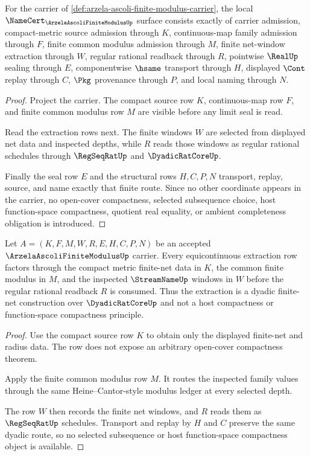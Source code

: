 \begin{theorem}
\label{thm:arzela-ascoli-finite-modulus-namecert-obligations}
For the carrier of \autoref{def:arzela-ascoli-finite-modulus-carrier}, the local $\NameCert_{\ArzelaAscoliFiniteModulusUp}$ surface consists exactly of carrier admission, compact-metric source admission through $K$, continuous-map family admission through $F$, finite common modulus admission through $M$, finite net-window extraction through $W$, regular rational readback through $R$, pointwise $\RealUp$ sealing through $E$, componentwise $\hsame$ transport through $H$, displayed $\Cont$ replay through $C$, $\Pkg$ provenance through $P$, and local naming through $N$.
\end{theorem}
\begin{proof}
Project the carrier. The compact source row $K$, continuous-map row $F$, and finite common modulus row $M$ are visible before any limit seal is read.

Read the extraction rows next. The finite windows $W$ are selected from displayed net data and inspected depths, while $R$ reads those windows as regular rational schedules through $\RegSeqRatUp$ and $\DyadicRatCoreUp$.

Finally the seal row $E$ and the structural rows $H,C,P,N$ transport, replay, source, and name exactly that finite route. Since no other coordinate appears in the carrier, no open-cover compactness, selected subsequence choice, host function-space compactness, quotient real equality, or ambient completeness obligation is introduced.
\end{proof}

\begin{theorem}
\label{thm:arzela-ascoli-equicontinuous-finite-net-extraction}
Let $A=(K,F,M,W,R,E,H,C,P,N)$ be an accepted $\ArzelaAscoliFiniteModulusUp$ carrier. Every equicontinuous extraction row factors through the compact metric finite-net data in $K$, the common finite modulus in $M$, and the inspected $\StreamNameUp$ windows in $W$ before the regular rational readback $R$ is consumed. Thus the extraction is a dyadic finite-net construction over $\DyadicRatCoreUp$ and not a host compactness or function-space compactness principle.
\end{theorem}
\begin{proof}
Use the compact source row $K$ to obtain only the displayed finite-net and radius data. The row does not expose an arbitrary open-cover compactness theorem.

Apply the finite common modulus row $M$. It routes the inspected family values through the same Heine--Cantor-style modulus ledger at every selected depth.

The row $W$ then records the finite net windows, and $R$ reads them as $\RegSeqRatUp$ schedules. Transport and replay by $H$ and $C$ preserve the same dyadic route, so no selected subsequence or host function-space compactness object is available.
\end{proof}

